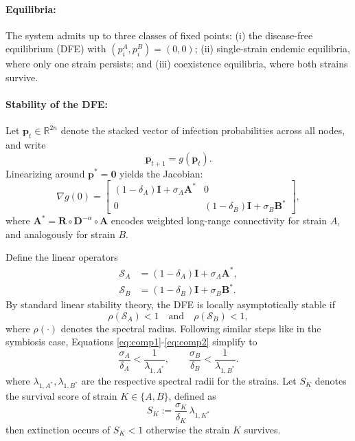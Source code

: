 \documentclass[a4paper,12pt]{scrartcl}
\theoremstyle{plain}%
\theoremstyle{definition}
\theoremstyle{remark}
\numberwithin{equation}{section}
\begin{document}
\paragraph{Equilibria:}
The system admits up to three classes of fixed points: (i) the disease-free equilibrium (DFE) with \( (p_i^A, p_i^B) = (0,0) \); (ii) single-strain endemic equilibria, where only one strain persists; and (iii) coexistence equilibria, where both strains survive. %

\paragraph{Stability of the DFE:}
Let \( \mathbf{p}_t \in \mathbb{R}^{2n} \) denote the stacked vector of infection probabilities across all nodes, and write
\[
\mathbf{p}_{t+1} = g(\mathbf{p}_t).
\]
Linearizing around \( \mathbf{p^*} = \mathbf{0} \) yields the Jacobian:
\[
\nabla g(0) =
\begin{bmatrix}
(1-\delta_A)\mathbf{I} + \sigma_{A} \mathbf{A}^* & 0 \\
0 & (1-\delta_B)\mathbf{I} + \sigma_{B} \mathbf{B}^*
\end{bmatrix},
\]
where \( \mathbf{A}^* = \mathbf{R}\circ \mathbf{D}^{-\alpha} \circ \mathbf{A} \) encodes weighted long-range connectivity for strain \( A \), and analogously for strain \( B \).  %

Define the linear operators
\begin{align}
\mathcal{S}_A &= (1-\delta_A)\mathbf{I} + \sigma_{A} \mathbf{A}^*, \label{eq:comp1} \\
\mathcal{S}_B &= (1-\delta_B)\mathbf{I} + \sigma_{B} \mathbf{B}^*.\label{eq:comp2}
\end{align}
By standard linear stability theory, the DFE is locally asymptotically stable if
\[
\rho(\mathcal{S}_A) < 1 \quad \text{and} \quad \rho(\mathcal{S}_B) < 1,
\]
where \( \rho(\cdot) \) denotes the spectral radius. Following similar steps like in the symbiosis case, Equations \ref{eq:comp1}-\ref{eq:comp2} simplify to 
\[
\frac{\sigma_{A}}{\delta_A} < \frac{1}{\lambda_{1,A^*}}, 
\qquad 
\frac{\sigma_{B}}{\delta_B} < \frac{1}{\lambda_{1,B^*}}.
\]
 where  \( \lambda_{1,A^*}, \lambda_{1,B^*} \) are the respective spectral radii for the strains.
Let $S_K$ denotes the survival score of strain $K \in \{A, B\}$, defined as
\[
S_K := \frac{\sigma_{K}}{\delta_K} \, \lambda_{1, K^*}
\]
then extinction occurs of $S_K<1$ otherwise the strain $K$ survives.
\end{document}
